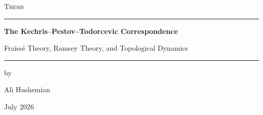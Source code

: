 \documentclass[12pt,openany]{book}
\newcommand{\thesistitle}{The Kechris--Pestov--Todorcevic Correspondence}
\newcommand{\thesissubtitle}{Fraïssé Theory, Ramsey Theory, and Topological Dynamics}
\newcommand{\thesisauthor}{Ali Hushemian}
\newcommand{\thesisdate}{July 2026}
\theoremstyle{plain}                    %
\theoremstyle{definition}
\theoremstyle{remark}
\theoremstyle{plain}
\numberwithin{theorem}{section}
\begin{document}
\frontmatter

\begin{titlepage}
  \thispagestyle{empty}
  \begin{center}
    \vspace*{0.12\textheight}

    {\Large\textsc{Thesis}\par}

    \vspace{1.8cm}
    \rule{0.78\textwidth}{0.6pt}\par
    \vspace{0.8cm}

    {\Huge\bfseries \thesistitle\par}

    \vspace{0.7cm}
    {\Large \thesissubtitle\par}

    \vspace{0.8cm}
    \rule{0.78\textwidth}{0.6pt}\par

    \vfill

    {\large by\par}
    \vspace{0.35cm}
    {\LARGE\thesisauthor\par}

    \vfill

    {\large\thesisdate\par}
  \end{center}
\end{titlepage}

\tableofcontents

\mainmatter












\backmatter

\end{document}
